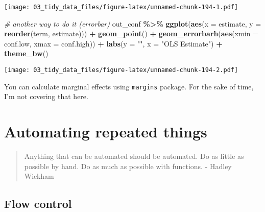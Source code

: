 \documentclass[
]{book}
\newenvironment{Shaded}{\begin{snugshade}}{\end{snugshade}}
\newcommand{\CommentTok}[1]{\textcolor[rgb]{0.56,0.35,0.01}{\textit{#1}}}
\newcommand{\DataTypeTok}[1]{\textcolor[rgb]{0.13,0.29,0.53}{#1}}
\newcommand{\KeywordTok}[1]{\textcolor[rgb]{0.13,0.29,0.53}{\textbf{#1}}}
\newcommand{\NormalTok}[1]{#1}
\newcommand{\OperatorTok}[1]{\textcolor[rgb]{0.81,0.36,0.00}{\textbf{#1}}}
\newcommand{\StringTok}[1]{\textcolor[rgb]{0.31,0.60,0.02}{#1}}
\begin{document}
\texttt{[image: 03\_tidy\_data\_files/figure-latex/unnamed-chunk-194-1.pdf]}

\begin{Shaded}
\begin{Highlighting}[]
\CommentTok{\# another way to do it (errorbar)}
\NormalTok{out\_conf }\OperatorTok{\%\textgreater{}\%}
\StringTok{  }\KeywordTok{ggplot}\NormalTok{(}\KeywordTok{aes}\NormalTok{(}\DataTypeTok{x =}\NormalTok{ estimate, }\DataTypeTok{y =} \KeywordTok{reorder}\NormalTok{(term, estimate))) }\OperatorTok{+}
\StringTok{  }\KeywordTok{geom\_point}\NormalTok{() }\OperatorTok{+}
\StringTok{  }\KeywordTok{geom\_errorbarh}\NormalTok{(}\KeywordTok{aes}\NormalTok{(}\DataTypeTok{xmin =}\NormalTok{ conf.low, }\DataTypeTok{xmax =}\NormalTok{ conf.high)) }\OperatorTok{+}
\StringTok{  }\KeywordTok{labs}\NormalTok{(}\DataTypeTok{y =} \StringTok{""}\NormalTok{, }\DataTypeTok{x =} \StringTok{"OLS Estimate"}\NormalTok{) }\OperatorTok{+}
\StringTok{  }\KeywordTok{theme\_bw}\NormalTok{()}
\end{Highlighting}
\end{Shaded}

\texttt{[image: 03\_tidy\_data\_files/figure-latex/unnamed-chunk-194-2.pdf]}

You can calculate marginal effects using \texttt{margins} package. For the sake of time, I'm not covering that here.

\hypertarget{functional_programming}{%
\chapter{Automating repeated things}\label{functional_programming}}

\begin{quote}
Anything that can be automated should be automated. Do as little as possible by hand. Do as much as possible with functions.
- Hadley Wickham
\end{quote}

\hypertarget{flow-control}{%
\section{Flow control}\label{flow-control}}
\end{document}

